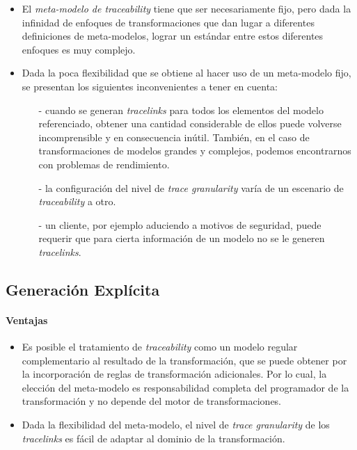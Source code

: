 \documentclass[a4paper,12pt,oneside,spanish]{book}
\begin{document}
\begin{itemize}[label={$\times$}]

\item El \textit{meta-modelo de traceability} tiene que ser necesariamente fijo, pero dada la infinidad de enfoques de transformaciones que dan lugar a diferentes definiciones de meta-modelos, lograr un estándar entre estos diferentes enfoques es muy complejo.

\item Dada la poca flexibilidad que se obtiene al hacer uso de un meta-modelo fijo, se presentan los siguientes inconvenientes a tener en cuenta:

\begin{itemize}

\item[-] cuando se generan \textit{tracelinks} para todos los elementos del modelo referenciado, obtener una cantidad considerable de ellos puede volverse incomprensible y en consecuencia inútil. También, en el caso de transformaciones de modelos grandes y complejos, podemos encontrarnos con problemas de rendimiento.

\item[-] la configuración del nivel de \textit{trace granularity} varía de un escenario de \textit{traceability} a otro.

\item[-] un cliente, por ejemplo aduciendo a motivos de seguridad, puede requerir que para cierta información de un modelo no se le generen \textit{tracelinks}.

\end{itemize}

\end{itemize}

\subsection{Generación Explícita}

\paragraph{Ventajas}

\begin{itemize}[label={\checkmark}]

\item Es posible el tratamiento de \textit{traceability} como un modelo regular complementario al resultado de la transformación, que se puede obtener por la incorporación de reglas de transformación adicionales. Por lo cual, la elección del meta-modelo es responsabilidad completa del programador de la transformación y no depende del motor de transformaciones. 

\item Dada la flexibilidad del meta-modelo, el nivel de \textit{trace granularity} de los \textit{tracelinks} es fácil de adaptar al dominio de la transformación.

\end{itemize}
\end{document}
